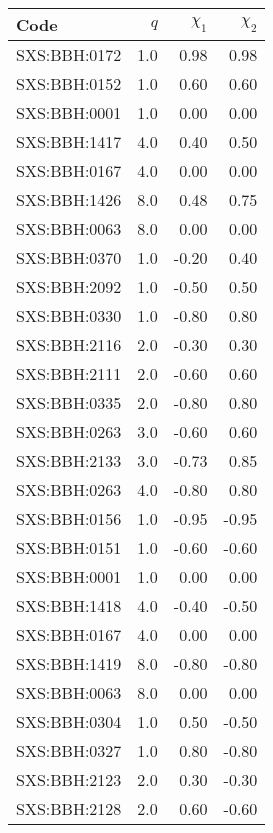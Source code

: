 \documentclass[twocolumn]{aastex631}
\begin{document}
\begin{table}[t]
	\centering
	\begin{tabularx}{0.8\columnwidth}{@{\extracolsep{\fill}}lrrr}
		\toprule\midrule Code         & $q$ & $\chi_1$ & $\chi_2$ \\
		\midrule\midrule SXS:BBH:0172 & 1.0 & 0.98     & 0.98     \\
		SXS:BBH:0152 & 1.0 & 0.60     & 0.60     \\
		SXS:BBH:0001 & 1.0 & 0.00     & 0.00     \\
		SXS:BBH:1417 & 4.0 & 0.40     & 0.50     \\
		SXS:BBH:0167 & 4.0 & 0.00     & 0.00     \\
		SXS:BBH:1426 & 8.0 & 0.48     & 0.75     \\
		SXS:BBH:0063 & 8.0 & 0.00     & 0.00     \\ \midrule 
		SXS:BBH:0370 & 1.0 & -0.20    & 0.40     \\
		SXS:BBH:2092 & 1.0 & -0.50    & 0.50     \\
		SXS:BBH:0330 & 1.0 & -0.80    & 0.80     \\
		SXS:BBH:2116 & 2.0 & -0.30    & 0.30     \\
		SXS:BBH:2111 & 2.0 & -0.60    & 0.60     \\
		SXS:BBH:0335 & 2.0 & -0.80    & 0.80     \\
		SXS:BBH:0263 & 3.0 & -0.60    & 0.60     \\
		SXS:BBH:2133 & 3.0 & -0.73    & 0.85     \\
		SXS:BBH:0263 & 4.0 & -0.80    & 0.80     \\ \midrule 
		SXS:BBH:0156 & 1.0 & -0.95    & -0.95    \\
		SXS:BBH:0151 & 1.0 & -0.60    & -0.60    \\
		SXS:BBH:0001 & 1.0 & 0.00     & 0.00     \\
		SXS:BBH:1418 & 4.0 & -0.40    & -0.50    \\
		SXS:BBH:0167 & 4.0 & 0.00     & 0.00     \\
		SXS:BBH:1419 & 8.0 & -0.80    & -0.80    \\
		SXS:BBH:0063 & 8.0 &  0.00    &  0.00    \\ \midrule 
		SXS:BBH:0304 & 1.0 & 0.50     & -0.50    \\
		SXS:BBH:0327 & 1.0 & 0.80     & -0.80    \\
		SXS:BBH:2123 & 2.0 & 0.30     & -0.30    \\
		SXS:BBH:2128 & 2.0 & 0.60     & -0.60    \\

\end{tabularx}
\end{table}
\end{document}

